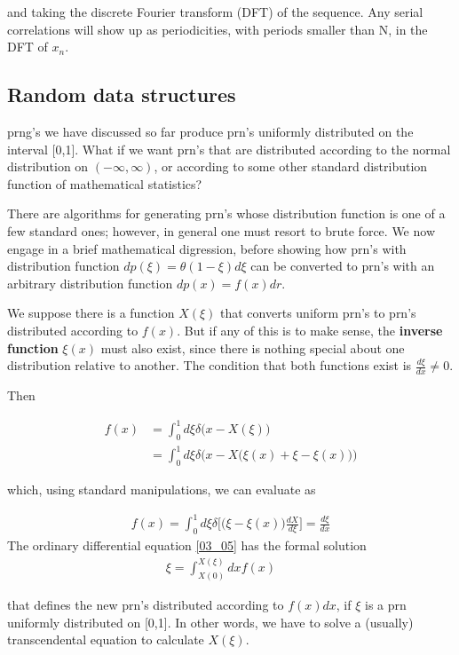 and taking the discrete Fourier transform (DFT) of the sequence.
Any serial correlations will show up as periodicities,
with periods smaller than N, in the DFT of $x_n$.

\subsection{Random data structures}
 prng's we have discussed so far produce prn's uniformly distributed
on the interval [0,1]. What if we want prn's that are
distributed according to the normal distribution on $(-\infty,\infty)$, or
according to some other standard distribution function of mathematical statistics?

There are algorithms for generating prn's whose distribution
function is one of a few standard ones; however, in general one
must resort to brute force. We now engage in a brief mathematical
digression, before showing how prn's with distribution function
$dp(\xi) = \theta(1 - \xi)d\xi$ can be converted to prn's with an arbitrary
distribution function $dp(x) =f(x)dr$.

We suppose there is a function $X(\xi)$ that converts uniform prn's
to prn's distributed according to $f(x)$. But if any of this is to make
sense, the \textbf{inverse function} $\xi(x)$ must also exist, since there is
nothing special about one distribution relative to another. The
condition that both functions exist is $\frac{d\xi}{dx}\neq 0$.

Then

\begin{align}
    f(x) &= \int_{0}^{1}d\xi\delta \Big(x-X(\xi)\Big)\nonumber \\
    &= \int_{0}^{1}d\xi\delta \Big(x-X\Big(\xi(x)+\xi-\xi(x)\Big)\Big)
\end{align}

which, using standard manipulations, we can evaluate as

\begin{eqnarray} 
    f(x)=\int_{0}^{1}d\xi\delta \Big[\Big(\xi-\xi(x)\Big)\frac{dX}{d\xi}\Big]=\frac{d\xi}{dx} \label{03_05}
\end{eqnarray} 
The ordinary differential equation \ref{03_05} has the formal solution
\begin{eqnarray} 
    \xi=\int_{X(0)}^{X(\xi)}dx f(x) \label{03_06} &&
\end{eqnarray} 

that defines the new prn's distributed according to $f(x)dx$, if $\xi$ is a
prn uniformly distributed on [0,1]. In other words, we have to
solve a (usually) transcendental equation to calculate $X(\xi)$.


